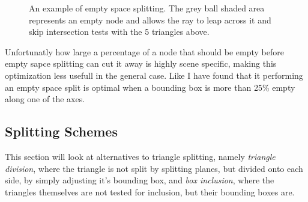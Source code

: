 \begin{figure}
  \centering
  \caption{An example of empty space splitting. The grey ball shaded
    area represents an empty node and allows the ray to leap across it
    and skip intersection tests with the 5 triangles above.}
  \label{fig:emptySpaceExample}
\end{figure}


Unfortunatly how large a percentage of a node that should be empty
before empty sapce splitting can cut it away is highly scene specific,
making this optimization less usefull in the general case. Like \zhou{}
I have found that it performing an empty space split is optimal when a
bounding box is more than 25\% empty along one of the axes.




\subsection{Splitting Schemes}\label{sec:splittingGeom}

This section will look at alternatives to triangle splitting, namely
\textit{triangle division}, where the triangle is not split by
splitting planes, but divided onto each side, by simply adjusting it's
bounding box, and \textit{box inclusion}, where the triangles
themselves are not tested for inclusion, but their bounding boxes are.

